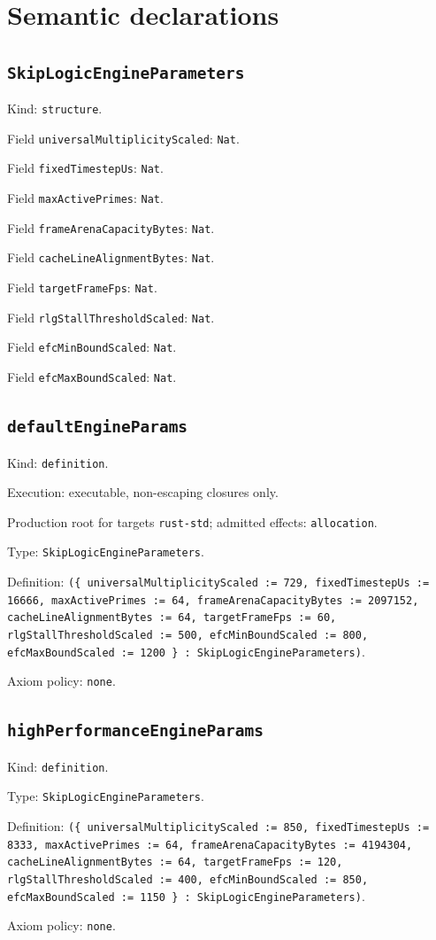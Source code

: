 \documentclass[11pt]{article}
\begin{document}
\section*{Semantic declarations}
\subsection*{\texttt{SkipLogicEngineParameters}}
\noindent Kind: \texttt{structure}.\par
\noindent Field \texttt{universalMultiplicityScaled}: \texttt{Nat}.\par
\noindent Field \texttt{fixedTimestepUs}: \texttt{Nat}.\par
\noindent Field \texttt{maxActivePrimes}: \texttt{Nat}.\par
\noindent Field \texttt{frameArenaCapacityBytes}: \texttt{Nat}.\par
\noindent Field \texttt{cacheLineAlignmentBytes}: \texttt{Nat}.\par
\noindent Field \texttt{targetFrameFps}: \texttt{Nat}.\par
\noindent Field \texttt{rlgStallThresholdScaled}: \texttt{Nat}.\par
\noindent Field \texttt{efcMinBoundScaled}: \texttt{Nat}.\par
\noindent Field \texttt{efcMaxBoundScaled}: \texttt{Nat}.\par
\subsection*{\texttt{defaultEngineParams}}
\noindent Kind: \texttt{definition}.\par
\noindent Execution: executable, non-escaping closures only.\par
\noindent Production root for targets \texttt{rust-std}; admitted effects: \texttt{allocation}.\par
\noindent Type: \texttt{SkipLogicEngineParameters}.\par
\noindent Definition: \texttt{(\{ universalMultiplicityScaled := 729, fixedTimestepUs := 16666, maxActivePrimes := 64, frameArenaCapacityBytes := 2097152, cacheLineAlignmentBytes := 64, targetFrameFps := 60, rlgStallThresholdScaled := 500, efcMinBoundScaled := 800, efcMaxBoundScaled := 1200 \} : SkipLogicEngineParameters)}.\par
\noindent Axiom policy: \texttt{none}.\par
\subsection*{\texttt{highPerformanceEngineParams}}
\noindent Kind: \texttt{definition}.\par
\noindent Type: \texttt{SkipLogicEngineParameters}.\par
\noindent Definition: \texttt{(\{ universalMultiplicityScaled := 850, fixedTimestepUs := 8333, maxActivePrimes := 64, frameArenaCapacityBytes := 4194304, cacheLineAlignmentBytes := 64, targetFrameFps := 120, rlgStallThresholdScaled := 400, efcMinBoundScaled := 850, efcMaxBoundScaled := 1150 \} : SkipLogicEngineParameters)}.\par
\noindent Axiom policy: \texttt{none}.\par
\end{document}
